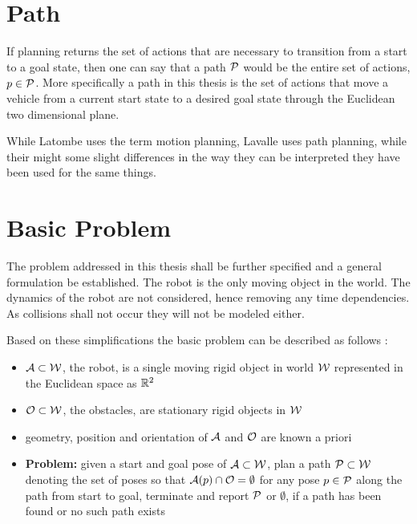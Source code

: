 \section{Path}
If planning returns the set of actions that are necessary to transition from a start to a goal state, then one can say that a path $\mathcal{P}$ would be the entire set of actions, $p \in \mathcal{P}$. More specifically a path in this thesis is the set of actions that move a vehicle from a current start state to a desired goal state through the Euclidean two dimensional plane.

While Latombe uses the term motion planning, Lavalle uses path planning, while their might some slight differences in the way they can be interpreted they have been used for the same things. %

\section{Basic Problem}
The problem addressed in this thesis shall be further specified and a general formulation be established. The robot is the only moving object in the world. The dynamics of the robot are not considered, hence removing any time dependencies. As collisions shall not occur they will not be modeled either.

Based on these simplifications the basic problem can be described as follows \cite{Latombe.1991,LaValle.2006}:
\begin{itemize}
\item $\mathcal{A} \subset \mathcal{W}$, the robot, is a single moving rigid object in world $\mathcal{W}$ represented in the Euclidean space as $\mathbb{R}^2$
\item $\mathcal{O} \subset \mathcal{W}$, the obstacles, are stationary rigid objects in $\mathcal{W}$
\item geometry, position and orientation of $\mathcal{A}$ and $\mathcal{O}$ are known a priori
\item \textbf{Problem:} given a start and goal pose of $\mathcal{A} \subset \mathcal{W}$, plan a path $\mathcal{P} \subset \mathcal{W}$ denoting the set of poses so that $\mathcal{A}(p) \cap \mathcal{O} = \emptyset$ for any pose  $p \in \mathcal{P}$ along the path from start to goal, terminate and report $\mathcal{P}$ or $\emptyset$, if a path has been found or no such path exists
\end{itemize}

